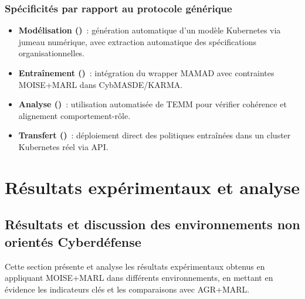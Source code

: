 \subsection{Spécificités par rapport au protocole générique}
\begin{itemize}
  \item \textbf{Modélisation ()}~: génération automatique d’un modèle Kubernetes via jumeau numérique, avec extraction automatique des spécifications organisationnelles.
  \item \textbf{Entraînement ()}~: intégration du wrapper MAMAD avec contraintes MOISE+MARL dans CybMASDE/KARMA.
  \item \textbf{Analyse ()}~: utilisation automatisée de TEMM pour vérifier cohérence et alignement comportement-rôle.
  \item \textbf{Transfert ()}~: déploiement direct des politiques entraînées dans un cluster Kubernetes réel via API.
\end{itemize}


\chapter{Résultats expérimentaux et analyse}

\section{Résultats et discussion des environnements non orientés Cyberdéfense}\label{sec:results_and_discussion_cyberdefense}

Cette section présente et analyse les résultats expérimentaux obtenus en appliquant MOISE+MARL dans différents environnements, en mettant en évidence les indicateurs clés et les comparaisons avec AGR+MARL.

